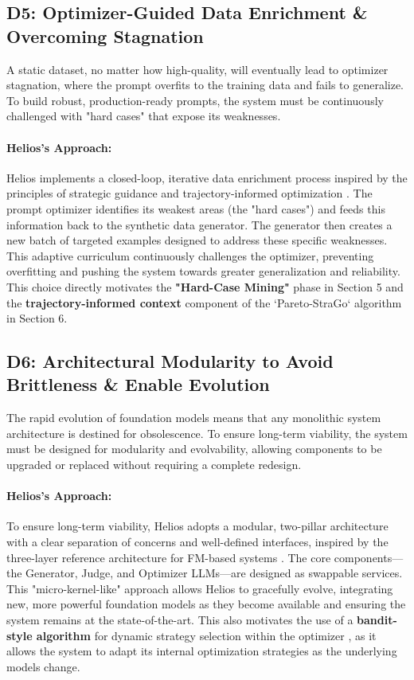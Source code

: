 \documentclass{article}
\begin{document}
\subsection*{D5: Optimizer-Guided Data Enrichment \& Overcoming Stagnation}
A static dataset, no matter how high-quality, will eventually lead to optimizer stagnation, where the prompt overfits to the training data and fails to generalize. To build robust, production-ready prompts, the system must be continuously challenged with "hard cases" that expose its weaknesses.

\paragraph{Helios's Approach:} Helios implements a closed-loop, iterative data enrichment process inspired by the principles of strategic guidance and trajectory-informed optimization \citep{wu2024stragoharnessingstrategicguidance, yang2024largelanguagemodelsoptimizers}. The prompt optimizer identifies its weakest areas (the "hard cases") and feeds this information back to the synthetic data generator. The generator then creates a new batch of targeted examples designed to address these specific weaknesses. This adaptive curriculum continuously challenges the optimizer, preventing overfitting and pushing the system towards greater generalization and reliability. This choice directly motivates the \textbf{"Hard-Case Mining"} phase in Section 5 and the \textbf{trajectory-informed context} component of the `Pareto-StraGo` algorithm in Section 6.

\subsection*{D6: Architectural Modularity to Avoid Brittleness \& Enable Evolution}
The rapid evolution of foundation models means that any monolithic system architecture is destined for obsolescence. To ensure long-term viability, the system must be designed for modularity and evolvability, allowing components to be upgraded or replaced without requiring a complete redesign.

\paragraph{Helios's Approach:} To ensure long-term viability, Helios adopts a modular, two-pillar architecture with a clear separation of concerns and well-defined interfaces, inspired by the three-layer reference architecture for FM-based systems \citep{lu2024referencearchitecturedesigningfoundation}. The core components—the Generator, Judge, and Optimizer LLMs—are designed as swappable services. This "micro-kernel-like" approach allows Helios to gracefully evolve, integrating new, more powerful foundation models as they become available and ensuring the system remains at the state-of-the-art. This also motivates the use of a \textbf{bandit-style algorithm} for dynamic strategy selection within the optimizer \citep{ashizawa2025banditbasedpromptdesignstrategy}, as it allows the system to adapt its internal optimization strategies as the underlying models change.
\end{document}
